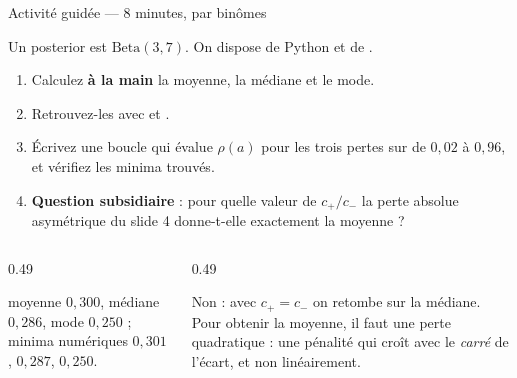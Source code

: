\begin{frame}{Activité guidée --- 8 minutes, par binômes}
\begin{abox}[Énoncé]
Un posterior est $\mathrm{Beta}(3, 7)$. On dispose de Python et de
.
\begin{enumerate}
  \item Calculez \textbf{à la main} la moyenne, la médiane et le mode.
  \item Retrouvez-les avec  et
        .
  \item Écrivez une boucle qui évalue $\rho(a)$ pour les trois pertes sur
         de $0{,}02$ à $0{,}96$, et vérifiez les minima trouvés.
  \item \textbf{Question subsidiaire} : pour quelle valeur de $c_+/c_-$ la
        perte absolue asymétrique du slide 4 donne-t-elle exactement la moyenne ?
\end{enumerate}
\end{abox}
\vspace{1mm}
\begin{columns}[t]
\begin{column}{0.49\textwidth}
\begin{solbox}
moyenne $0{,}300$, médiane $0{,}286$, mode $0{,}250$ ;
minima numériques $0{,}301$, $0{,}287$, $0{,}250$.
\end{solbox}
\end{column}
\begin{column}{0.49\textwidth}
\begin{kbox}
Non : avec $c_+ = c_-$ on retombe sur la médiane. Pour obtenir la moyenne, il
faut une perte quadratique : une pénalité qui croît avec le \emph{carré} de
l'écart, et non linéairement.
\end{kbox}
\end{column}
\end{columns}
\end{frame}

